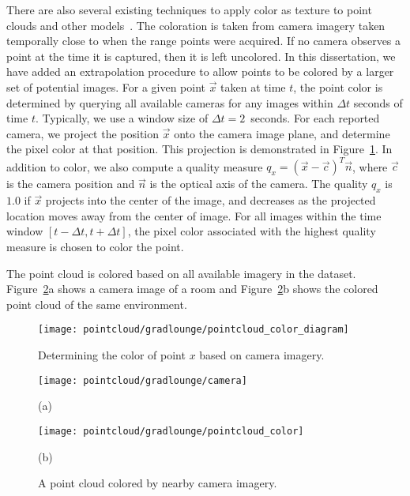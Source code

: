 \documentclass[12pt,onecolumn,oneside]{book}
\begin{document}
There are also several existing techniques to apply color as texture to point clouds and other models~\cite{Oreifej14,Cheng13,Cheng14}.  The coloration is taken from camera imagery taken temporally close to when the range points were acquired.  If no camera observes a point at the time it is captured, then it is left uncolored.  In this dissertation, we have added an extrapolation procedure to allow points to be colored by a larger set of potential images.  For a given point $\vec{x}$ taken at time $t$, the point color is determined by querying all available cameras for any images within $\Delta t$ seconds of time $t$.  Typically, we use a window size of $\Delta t = 2$~seconds.  For each reported camera, we project the position $\vec{x}$ onto the camera image plane, and determine the pixel color at that position.  This projection is demonstrated in Figure~\ref{fig:pointcloud_color_diagram}.  In addition to color, we also compute a quality measure $q_x = (\vec{x} - \vec{c})^T \vec{n}$, where $\vec{c}$ is the camera position and $\vec{n}$ is the optical axis of the camera.  The quality $q_x$ is $1.0$ if $\vec{x}$ projects into the center of the image, and decreases as the projected location moves away from the center of image.  For all images within the time window $[t - \Delta t, t + \Delta t]$, the pixel color associated with the highest quality measure is chosen to color the point.

The point cloud is colored based on all available imagery in the dataset.  Figure~\ref{fig:pointcloud_color}a shows a camera image of a room and Figure~\ref{fig:pointcloud_color}b shows the colored point cloud of the same environment.

\begin{figure}
	\centerline{\texttt{[image: pointcloud/gradlounge/pointcloud\_color\_diagram]}}
	\caption{Determining the color of point $x$ based on camera imagery.}
	\label{fig:pointcloud_color_diagram}
\end{figure}

\begin{figure}
	\begin{minipage}[t]{0.5\linewidth}
		\centerline{\texttt{[image: pointcloud/gradlounge/camera]}}
		\centerline{(a)}
	\end{minipage}
	\hfill
	\begin{minipage}[t]{0.5\linewidth}
		\centerline{\texttt{[image: pointcloud/gradlounge/pointcloud\_color]}}
		\centerline{(b)}
	\end{minipage}

	\caption{A point cloud colored by nearby camera imagery.}
	\label{fig:pointcloud_color}
\end{figure}
\end{document}
